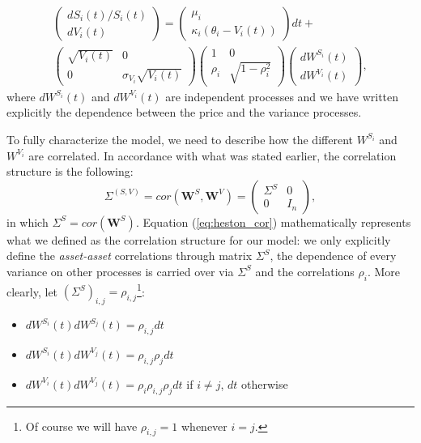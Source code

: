  \begin{multline}
 \label{eq:mv_heston}
\begin{pmatrix}
	dS_i(t) / S_i(t)\\
	dV_i(t)
\end{pmatrix}
= \begin{pmatrix}
\mu_i\\
\kappa_i (\theta_i - V_i(t))
\end{pmatrix}
dt  +\\ \begin{pmatrix}
\sqrt{V_i(t)} & 0 \\
0 & \sigma_{V_i} \sqrt{V_i(t)} 
\end{pmatrix}
\begin{pmatrix}
1 & 0 \\
 \rho_i & \sqrt{1-\rho_i^2} 
\end{pmatrix}
\begin{pmatrix}
dW^{S_i}(t)\\
dW^{V_i }(t)
\end{pmatrix},
\end{multline}
\noindent
where $dW^{S_i}(t)$ and $dW^{V_i}(t)$ are independent processes and we have written explicitly the dependence between the price and the variance processes.

To fully characterize the model, we need to describe how the different $W^{S_i}$ and $W^{V_i}$ are correlated. In accordance with what was stated earlier, the correlation structure is the following:
\begin{equation}
\label{eq:heston_cor}
\Sigma^{(S,V)} = cor(\boldsymbol{W}^{S}, \boldsymbol{W}^{V}) = \begin{pmatrix}
\Sigma^{S} & 0 \\
0& I_n
\end{pmatrix},
\end{equation}
\noindent
in which $\Sigma^S = cor(\boldsymbol{W}^{S})$.
Equation (\ref{eq:heston_cor}) mathematically represents what we defined as the correlation structure for our model: we only explicitly define the \textit{asset-asset} correlations through matrix $\Sigma^S$, the dependence of every variance  on other processes is carried over via $\Sigma^S$ and the correlations $\rho_i$.
More clearly, let $(\Sigma^S)_{i,j} = \rho_{i,j}$\footnote{Of course we will have $\rho_{i,j} = 1 $ whenever $i=j$.}:
\begin{itemize}
	\item $dW^{S_i}(t) dW^{S_j}(t) = \rho_{i,j} dt$
	\item $dW^{S_i}(t) dW^{V_j}(t) = \rho_{i,j} \rho_j dt$
	\item $dW^{V_i}(t) dW^{V_j}(t) = \rho_i \rho_{i,j}\rho_j dt $ if $i\neq j$, $dt$ otherwise
\end{itemize}

